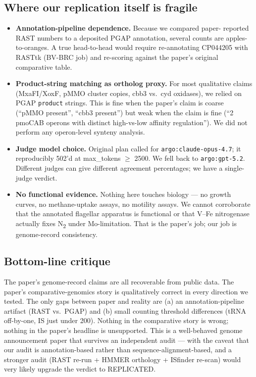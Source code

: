 \documentclass[11pt]{article}
\begin{document}
\subsection*{Where our replication itself is fragile}
\begin{itemize}
  \item \textbf{Annotation-pipeline dependence.} Because we compared paper-
    reported RAST numbers to a deposited PGAP annotation, several counts are
    apples-to-oranges. A true head-to-head would require re-annotating
    CP044205 with RASTtk (BV-BRC job) and re-scoring against the paper's
    original comparative table.
  \item \textbf{Product-string matching as ortholog proxy.} For most
    qualitative claims (MxaFI/XoxF, pMMO cluster copies, cbb3 vs.\ cyd
    oxidases), we relied on PGAP \texttt{product} strings. This is fine when
    the paper's claim is coarse (``pMMO present'', ``cbb3 present'') but
    weak when the claim is fine (``2 pmoCAB operons with distinct
    high-vs-low affinity regulation''). We did not perform any operon-level
    synteny analysis.
  \item \textbf{Judge model choice.} Original plan called for
    \texttt{argo:claude-opus-4.7}; it reproducibly 502'd at max\_tokens
    $\ge$ 2500. We fell back to \texttt{argo:gpt-5.2}. Different judges can
    give different agreement percentages; we have a single-judge verdict.
  \item \textbf{No functional evidence.} Nothing here touches biology ---
    no growth curves, no methane-uptake assays, no motility assays. We
    cannot corroborate that the annotated flagellar apparatus is functional
    or that V--Fe nitrogenase actually fixes N\textsubscript{2} under
    Mo-limitation. That is the paper's job; our job is genome-record
    consistency.
\end{itemize}

\subsection*{Bottom-line critique}
The paper's genome-record claims are all recoverable from public data. The
paper's comparative-genomics story is qualitatively correct in every direction
we tested. The only gaps between paper and reality are (a) an
annotation-pipeline artifact (RAST vs.\ PGAP) and (b) small counting
threshold differences (tRNA off-by-one, IS just under 200). Nothing in the
comparative story is wrong; nothing in the paper's headline is unsupported.
This is a well-behaved genome announcement paper that survives an
independent audit --- with the caveat that our audit is annotation-based
rather than sequence-alignment-based, and a stronger audit (RAST re-run
+ HMMER orthology + ISfinder re-scan) would very likely upgrade the
verdict to REPLICATED.
\end{document}
